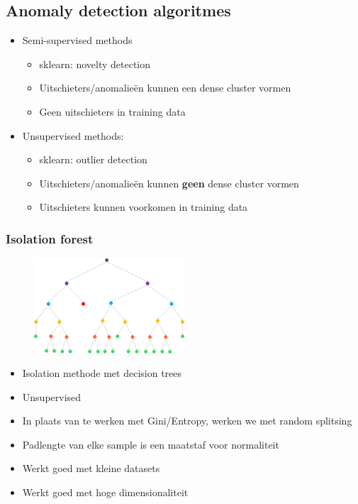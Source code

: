 \documentclass{article}
\begin{document}
\subsection{Anomaly detection algoritmes}

\begin{itemize}
    \item Semi-supervised methods
    \begin{itemize}
        \item sklearn: novelty detection
        \item Uitschieters/anomalieën kunnen een dense cluster vormen
        \item Geen uitschieters in training data
    \end{itemize}
    \item Unsupervised methods:
    \begin{itemize}
        \item sklearn: outlier detection
        \item Uitschieters/anomalieën kunnen \textbf{geen} dense cluster vormen
        \item Uitschieters kunnen voorkomen in training data
    \end{itemize}
\end{itemize}

\subsubsection{Isolation forest}

\begin{figure}[H]
    \centering
    \includegraphics[width=0.5\textwidth]{isolation-forest.png}
\end{figure}


\begin{itemize}
    \item Isolation methode met decision trees
    \item Unsupervised
    \item In plaats van te werken met Gini/Entropy, werken we met random splitsing
    \item Padlengte van elke sample is een maatstaf voor normaliteit
    \item Werkt goed met kleine datasets
    \item Werkt goed met hoge dimensionaliteit 
\end{itemize}
\end{document}

